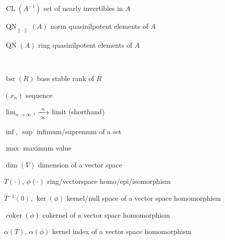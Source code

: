 \documentclass[12pt, oneside]{book}
\def\QN{\operatorname{QN}}
\def\inf{\operatorname{inf}}
\def\ker{\operatorname{ker}}
\def\coker{\operatorname{coker}}
\def\CL{\operatorname{CL}}
\def\max{\operatorname{max}}
\def\bsr{\operatorname{bsr}}
\def\dim{\operatorname{dim}}
\begin{document}
\pagebreak


\begin{changemargin}{-2cm}{-2cm}

\noindent
\begin{minipage}[t]{0.6\textwidth}


$\CL(A^{-1})$ \hfill set of nearly invertibles in $A$\

\medskip

$\QN_{\| \cdot \|}(A)$ \hfill norm quasinilpotent elements of $A$\

\medskip

$\QN(A)$ \hfill ring quasinilpotent elements of $A$\


\end{minipage}
\begin{minipage}[t]{0.05\textwidth}

${}$\\

\end{minipage}
\begin{minipage}[t]{0.6\textwidth}


$\bsr(R)$ \hfill bass stable rank of $R$\

\medskip

$(x_n)$ \hfill sequence\

\medskip

$\displaystyle{\lim_{n \to \infty}}$, $\xlongrightarrow[\infty]{n}$ \hfill  limit (shorthand)\

\medskip

$\inf$, $\sup$ \hfill infimum/supremum of a set\

\medskip

$\max$ \hfill maximum value\\

\end{minipage}


\bigskip

$\dim(V)$ \hfill dimension of a vector space\

\medskip

$T(\cdot)$, $\phi(\cdot)$ \hfill ring/vectorspace homo/epi/isomorphism\

\medskip

$T^{-1}(0)$, $\ker(\phi)$ \hfill  kernel/null space of a vector space homomorphism\

\medskip

$\coker(\phi)$ \hfill cokernel of a vector space homomorphism\

\medskip

$\alpha(T)$, $\alpha(\phi)$ \hfill kernel index of a vector space homomorphism\


\end{changemargin}
\end{document}
